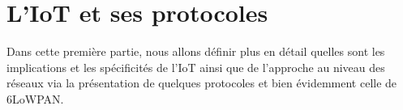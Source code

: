 
\section{L'IoT et ses protocoles}

Dans cette première partie, nous allons définir plus en détail quelles sont les implications et les spécificités de l'IoT ainsi que de l'approche au niveau des réseaux via la présentation de quelques protocoles et bien évidemment celle de 6LoWPAN.




